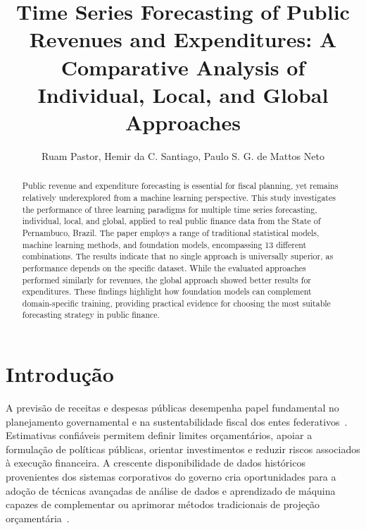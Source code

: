 \documentclass[12pt]{article}
\title{Time Series Forecasting of Public Revenues and Expenditures: A Comparative Analysis of Individual, Local, and Global Approaches}
\author{
Ruam Pastor\inst{1},
Hemir da C. Santiago\inst{2},
Paulo S. G. de Mattos Neto\inst{1}
}
\begin{document}
\maketitle

\begin{abstract}

Public revenue and expenditure forecasting is essential for fiscal planning, yet remains relatively underexplored from a machine learning perspective. This study investigates the performance of three learning paradigms for multiple time series forecasting, individual, local, and global, applied to real public finance data from the State of Pernambuco, Brazil. The paper employs a range of traditional statistical models, machine learning methods, and foundation models, encompassing 13 different combinations. The results indicate that no single approach is universally superior, as performance depends on the specific dataset. While the evaluated approaches performed similarly for revenues, the global approach showed better results for expenditures. These findings highlight how foundation models can complement domain-specific training, providing practical evidence for choosing the most suitable forecasting strategy in public finance.
\end{abstract}

\section{Introdução}
\label{sec:intro}

A previsão de receitas e despesas públicas desempenha papel fundamental no planejamento governamental e na sustentabilidade fiscal dos entes federativos~\cite{cbo2024budget}. Estimativas confiáveis permitem definir limites orçamentários, apoiar a formulação de políticas públicas, orientar investimentos e reduzir riscos associados à execução financeira. A crescente disponibilidade de dados históricos provenientes dos sistemas corporativos do governo cria oportunidades para a adoção de técnicas avançadas de análise de dados e aprendizado de máquina capazes de complementar ou aprimorar métodos tradicionais de projeção orçamentária~\cite{buettner2010revenue,frankel2011over}. 
\end{document}
